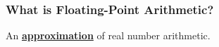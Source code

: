 \begin{frame}

\frametitle{What is Floating-Point Arithmetic?}

\begin{center}

An \textbf{\underline{approximation}} of real number arithmetic.

\end{center}

\end{frame}

